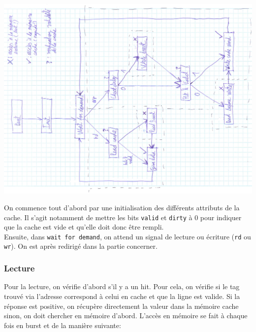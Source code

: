 \documentclass[10pt,a4paper]{article}
\begin{document}
\begin{center}

\includegraphics[width=1.3\textwidth, angle=-90]{images/mss}

\end{center}

\newpage

On commence tout d'abord par une initialisation des différents attributs de la cache. Il s'agit notamment de mettre les bits \texttt{valid} et \texttt{dirty} à 0 pour indiquer que la cache est vide et qu'elle doit donc être rempli.\\

Ensuite, dans \texttt{wait for demand}, on attend un signal de lecture ou écriture (\texttt{rd} ou \texttt{wr}). On est après redirigé dans la partie concerner.

\subsubsection{Lecture}
Pour la lecture, on vérifie d'abord s'il y a un hit. Pour cela, on vérifie si le tag trouvé via l'adresse correspond à celui en cache et que la ligne est valide.
Si la réponse est positive, on récupère directement la valeur dans la mémoire cache sinon, on doit chercher en mémoire d'abord.
L'accès en mémoire se fait à chaque fois en burst et de la manière suivante:
\end{document}

